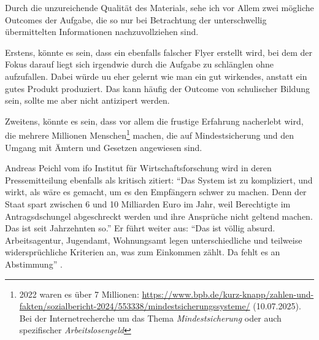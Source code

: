 Durch die unzureichende Qualität des Materials, sehe ich vor Allem zwei mögliche Outcomes der Aufgabe, die so nur bei Betrachtung der unterschwellig übermittelten Informationen nachzuvollziehen sind.

Erstens, könnte es sein, dass ein ebenfalls falscher Flyer erstellt wird, bei dem der Fokus darauf liegt sich irgendwie durch die Aufgabe zu schlänglen ohne aufzufallen. Dabei würde \gls{uu} eher gelernt wie man ein gut wirkendes, anstatt ein gutes Produkt produziert. Das kann häufig der Outcome von schulischer Bildung sein, sollte \gls{me} aber nicht antizipert werden.

Zweitens, könnte es sein, dass vor allem die frustige Erfahrung nacherlebt wird, die mehrere Millionen Menschen\footnote{
    2022 waren es über 7 Millionen: \url{https://www.bpb.de/kurz-knapp/zahlen-und-fakten/sozialbericht-2024/553338/mindestsicherungssysteme/} (10.07.2025). Bei der Internetrecherche um das Thema \emph{Mindestsicherung} oder auch spezifischer \emph{Arbeitslosengeld} %
    } 
machen, die auf Mindestsicherung und den Umgang mit Ämtern und Gesetzen angewiesen sind. 

Andreas Peichl vom ifo Institut für Wirtschaftsforschung wird in deren Pressemitteilung ebenfalls als kritisch zitiert: \enquote{Das System ist zu kompliziert, und wirkt, als wäre es gemacht, um es den Empfängern schwer zu machen. Denn der Staat spart zwischen 6 und 10 Milliarden Euro im Jahr, weil Berechtigte im Antragsdschungel abgeschreckt werden und ihre Ansprüche nicht geltend machen. Das ist seit Jahrzehnten so.} Er führt weiter aus: \enquote{Das ist völlig absurd. Arbeitsagentur, Jugendamt, Wohnungsamt legen unterschiedliche und teilweise widersprüchliche Kriterien an, was zum Einkommen zählt. Da fehlt es an Abstimmung} \autocite{ifo.05.05.2021}.


